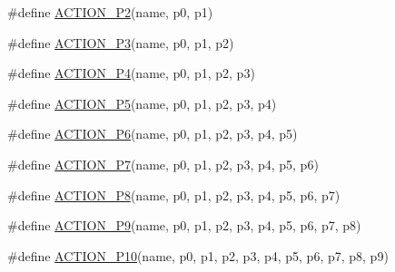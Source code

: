 \begin{DoxyCompactItemize}
\#define \mbox{\hyperlink{gmock-generated-actions_8h_a69fbf9ae696cc4cf779e22cb0960a067}{A\+C\+T\+I\+O\+N\+\_\+\+P2}}(name,  p0,  p1)
\item 
\#define \mbox{\hyperlink{gmock-generated-actions_8h_ab038de3f66ae709773473c18b6a43b29}{A\+C\+T\+I\+O\+N\+\_\+\+P3}}(name,  p0,  p1,  p2)
\item 
\#define \mbox{\hyperlink{gmock-generated-actions_8h_af416cf9b0288fce8b2c4b71e4df6cfc0}{A\+C\+T\+I\+O\+N\+\_\+\+P4}}(name,  p0,  p1,  p2,  p3)
\item 
\#define \mbox{\hyperlink{gmock-generated-actions_8h_ad0bb4c20795e7efe55b9b76f334554b2}{A\+C\+T\+I\+O\+N\+\_\+\+P5}}(name,  p0,  p1,  p2,  p3,  p4)
\item 
\#define \mbox{\hyperlink{gmock-generated-actions_8h_a3a8af72f23167873fcd5fc7476a4fabc}{A\+C\+T\+I\+O\+N\+\_\+\+P6}}(name,  p0,  p1,  p2,  p3,  p4,  p5)
\item 
\#define \mbox{\hyperlink{gmock-generated-actions_8h_a82d96846bae4fee8432385fd24b0a7ee}{A\+C\+T\+I\+O\+N\+\_\+\+P7}}(name,  p0,  p1,  p2,  p3,  p4,  p5,  p6)
\item 
\#define \mbox{\hyperlink{gmock-generated-actions_8h_a150147ecae8b84107be8575e4b2560cc}{A\+C\+T\+I\+O\+N\+\_\+\+P8}}(name,  p0,  p1,  p2,  p3,  p4,  p5,  p6,  p7)
\item 
\#define \mbox{\hyperlink{gmock-generated-actions_8h_a6a38804f2dce3fa758335676b4c26cda}{A\+C\+T\+I\+O\+N\+\_\+\+P9}}(name,  p0,  p1,  p2,  p3,  p4,  p5,  p6,  p7,  p8)
\item 
\#define \mbox{\hyperlink{gmock-generated-actions_8h_aff3ff3b23965dd03539aa4cbc5181002}{A\+C\+T\+I\+O\+N\+\_\+\+P10}}(name,  p0,  p1,  p2,  p3,  p4,  p5,  p6,  p7,  p8,  p9)
\end{DoxyCompactItemize}
